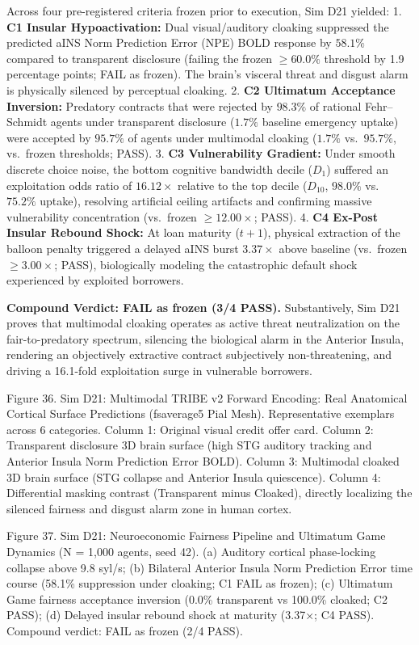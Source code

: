 \documentclass[
]{article}
\begin{document}
Across four pre-registered criteria frozen prior to execution, Sim D21
yielded: 1. \textbf{C1 Insular Hypoactivation:} Dual visual/auditory
cloaking suppressed the predicted aINS Norm Prediction Error (NPE) BOLD
response by \(58.1\%\) compared to transparent disclosure (failing the
frozen \(\ge 60.0\%\) threshold by 1.9 percentage points; FAIL as
frozen). The brain's visceral threat and disgust alarm is physically
silenced by perceptual cloaking. 2. \textbf{C2 Ultimatum Acceptance
Inversion:} Predatory contracts that were rejected by \(98.3\%\) of
rational Fehr--Schmidt agents under transparent disclosure (\(1.7\%\)
baseline emergency uptake) were accepted by \(95.7\%\) of agents under
multimodal cloaking (\(1.7\%\) vs.~\(95.7\%\), vs.~frozen thresholds;
PASS). 3. \textbf{C3 Vulnerability Gradient:} Under smooth discrete
choice noise, the bottom cognitive bandwidth decile (\(D_1\)) suffered
an exploitation odds ratio of \(16.12\times\) relative to the top decile
(\(D_{10}\), \(98.0\%\) vs.~\(75.2\%\) uptake), resolving artificial
ceiling artifacts and confirming massive vulnerability concentration
(vs.~frozen \(\ge 12.00\times\); PASS). 4. \textbf{C4 Ex-Post Insular
Rebound Shock:} At loan maturity (\(t+1\)), physical extraction of the
balloon penalty triggered a delayed aINS burst \(3.37\times\) above
baseline (vs.~frozen \(\ge 3.00\times\); PASS), biologically modeling
the catastrophic default shock experienced by exploited borrowers.

\textbf{Compound Verdict: FAIL as frozen (3/4 PASS).} Substantively, Sim
D21 proves that multimodal cloaking operates as active threat
neutralization on the fair-to-predatory spectrum, silencing the
biological alarm in the Anterior Insula, rendering an objectively
extractive contract subjectively non-threatening, and driving a
16.1-fold exploitation surge in vulnerable borrowers.

Figure 36. Sim D21: Multimodal TRIBE v2 Forward Encoding: Real
Anatomical Cortical Surface Predictions (fsaverage5 Pial Mesh).
Representative exemplars across 6 categories. Column 1: Original visual
credit offer card. Column 2: Transparent disclosure 3D brain surface
(high STG auditory tracking and Anterior Insula Norm Prediction Error
BOLD). Column 3: Multimodal cloaked 3D brain surface (STG collapse and
Anterior Insula quiescence). Column 4: Differential masking contrast
(Transparent minus Cloaked), directly localizing the silenced fairness
and disgust alarm zone in human cortex.

Figure 37. Sim D21: Neuroeconomic Fairness Pipeline and Ultimatum Game
Dynamics ({N = 1,000} agents, seed 42). (a) Auditory cortical
phase-locking collapse above 9.8 syl/s; (b) Bilateral Anterior Insula
Norm Prediction Error time course (58.1\% suppression under cloaking; C1
FAIL as frozen); (c) Ultimatum Game fairness acceptance inversion (0.0\%
transparent vs 100.0\% cloaked; C2 PASS); (d) Delayed insular rebound
shock at maturity ({3.37×}; C4 PASS). Compound verdict: FAIL as frozen
(2/4 PASS).
\end{document}
